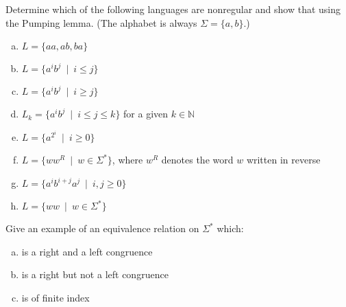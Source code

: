 \documentclass[a4paper,12pt]{amsart}
\begin{document}
    
\medskip\begin{problem}
    
    Determine which of the following languages are nonregular and show that using the Pumping lemma. (The alphabet is always $\Sigma=\{a,b\}$.)
    
    \medskip
      
    \begin{enumerate}[(a)]\setlength\itemsep{12pt}
        \item $L=\{aa, ab, ba\}$
        \item $L=\{a^ib^j\ \mid\ i\leq j\}$
        \item $L=\{a^ib^j\ \mid\ i\geq j\}$
        \item $L_k=\{a^ib^j\ \mid\ i\leq j\leq k\}$ for a given $k\in\mathbb N$
        \item $L=\{a^{2^i}\ \mid\ i\geq 0\}$
        \item $L=\{ww^R\ \mid \ w\in\Sigma^*\}$, where $w^R$ denotes the word $w$ written in reverse
        \item $L=\{a^ib^{i+j}a^j\ \mid\ i,j\geq 0\}$
        \item $L=\{ww\ \mid \ w\in\Sigma^*\}$
    \end{enumerate}
      
\end{problem}


\medskip\begin{problem}

    Give an example of an equivalence relation on $\Sigma^*$ which:

    \medskip
    
    \begin{enumerate}[(a)]\setlength\itemsep{12pt}
        \item is a right and a left congruence
        \item is a right but not a left congruence
        \item is of finite index
    \end{enumerate}

\end{problem}

   
    
\end{document}
